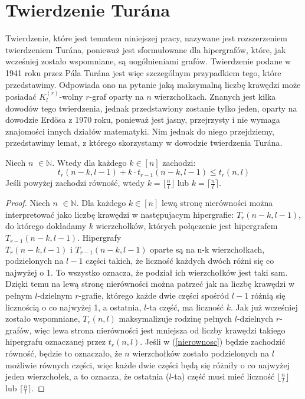 \documentclass[miz,woman]{mgrwms}
\begin{document}
\section{Twierdzenie Tur\'ana}
Twierdzenie, które jest tematem niniejszej pracy, nazywane jest rozszerzeniem twierdzeniem Tur\'ana, ponieważ jest sformułowane
dla hipergrafów, które, jak wcześniej zostało wspomniane, są uogólnieniami grafów. Twierdzenie podane w 1941 roku przez
P\'ala Tur\'ana jest więc szczególnym przypadkiem tego, które przedstawimy. Odpowiada ono na pytanie jaką maksymalną
liczbę krawędzi może posiadać $K_l^{(r)}$-wolny $r$-graf oparty na $n$ wierzchołkach. Znanych jest kilka dowodów tego twierdzenia,
jednak przedstawiony zostanie tylko jeden, oparty na dowodzie Erd\"osa z 1970 roku, ponieważ jest jasny, przejrzysty
i nie wymaga znajomości innych działów matematyki. Nim jednak do niego przejdziemy, przedstawimy lemat, z którego skorzystamy
w dowodzie twierdzenia Tur\'ana. 
\begin{lem} \label{lemat}
 Niech $n$ $\in \mathbb{N}$. Wtedy dla każdego $k \in [n]$ zachodzi:
\begin{equation}
t_r(n-k,l-1)+k \cdot t_{r-1}(n-k,l-1)\leq t_r(n,l) \label{nierownosc}
\end{equation}
Jeśli powyżej zachodzi równość, wtedy $k=\lfloor \frac{n}{l} \rfloor$ lub $k=\lceil \frac{n}{l} \rceil$.
\end{lem}
\begin{proof}
Niech $n$ $\in \mathbb{N}$. Dla każdego $k \in [n]$ lewą stronę nierówności można interpretować jako liczbę krawędzi w
następujacym hipergrafie: $T_r(n-k,l-1)$, do którego dokładamy $k$ wierzchołków, których połączenie jest hipergrafem
$T_{r-1}(n-k,l-1)$. Hipergrafy\\$T_r(n-k,l-1)$ i $T_{r-1}(n-k,l-1)$ oparte są na n-k wierzchołkach, podzielonych 
na $l-1$ części takich, że liczność każdych dwóch różni się co najwyżej o 1. To wszystko oznacza, że  podział ich wierzchołków jest
taki sam. Dzięki temu na lewą stronę nierówności można patrzeć jak na liczbę krawędzi w pełnym $l$-dzielnym $r$-grafie, 
którego każde dwie części spośród $l-1$ różnią się licznością o co najwyżej 1, a ostatnia, $l$-ta część, ma liczność $k$.
Jak już wcześniej zostało wspomniane, $T_r(n,l)$ maksymalizuje rodzinę pełnych $l$-dzielnych $r$-grafów, więc lewa strona
nierówności jest mniejsza od liczby krawędzi takiego hipergrafu oznaczanej przez $t_r(n,l)$. Jeśli w (\ref{nierownosc}) będzie zachodzić
równość, będzie to oznaczało, że $n$ wierzchołków zostało podzielonych na $l$ możliwie równych części, więc każde dwie części
będą się różniły o co najwyżej jeden wierzchołek, a to oznacza, że ostatnia ($l$-ta) część musi mieć liczność 
$\lfloor \frac{n}{l} \rfloor$ lub $\lceil \frac{n}{l} \rceil$.
\end{proof}
\end{document}
